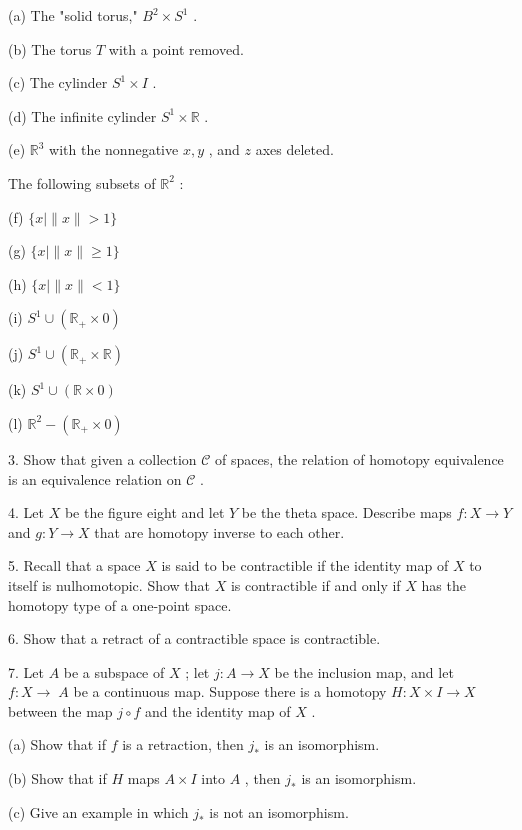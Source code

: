 \documentclass[10pt]{article}
\begin{document}
(a) The "solid torus," \({B}^{2} \times  {S}^{1}\) .

(b) The torus \(T\) with a point removed.

(c) The cylinder \({S}^{1} \times  I\) .

(d) The infinite cylinder \({S}^{1} \times  \mathbb{R}\) .

(e) \({\mathbb{R}}^{3}\) with the nonnegative \(x,y\) , and \(z\) axes deleted.

The following subsets of \({\mathbb{R}}^{2}\) :

(f) \(\{ x \mid  \parallel x\parallel  > 1\}\)

(g) \(\{ x \mid  \parallel x\parallel  \geq  1\}\)

(h) \(\{ x \mid  \parallel x\parallel  < 1\}\)

(i) \({S}^{1} \cup  \left( {{\mathbb{R}}_{ + } \times  0}\right)\)

(j) \({S}^{1} \cup  \left( {{\mathbb{R}}_{ + } \times  \mathbb{R}}\right)\)

(k) \({S}^{1} \cup  \left( {\mathbb{R} \times  0}\right)\)

(l) \({\mathbb{R}}^{2} - \left( {{\mathbb{R}}_{ + } \times  0}\right)\)

3. Show that given a collection \(\mathcal{C}\) of spaces, the relation of homotopy equivalence is an equivalence relation on \(\mathcal{C}\) .

4. Let \(X\) be the figure eight and let \(Y\) be the theta space. Describe maps \(f : X \rightarrow  Y\) and \(g : Y \rightarrow  X\) that are homotopy inverse to each other.

5. Recall that a space \(X\) is said to be contractible if the identity map of \(X\) to itself is nulhomotopic. Show that \(X\) is contractible if and only if \(X\) has the homotopy type of a one-point space.

6. Show that a retract of a contractible space is contractible.

7. Let \(A\) be a subspace of \(X\) ; let \(j : A \rightarrow  X\) be the inclusion map, and let \(f : X \rightarrow \; A\) be a continuous map. Suppose there is a homotopy \(H : X \times  I \rightarrow  X\) between the map \(j \circ  f\) and the identity map of \(X\) .

(a) Show that if \(f\) is a retraction, then \({j}_{ * }\) is an isomorphism.

(b) Show that if \(H\) maps \(A \times  I\) into \(A\) , then \({j}_{ * }\) is an isomorphism.

(c) Give an example in which \({j}_{ * }\) is not an isomorphism.
\end{document}
